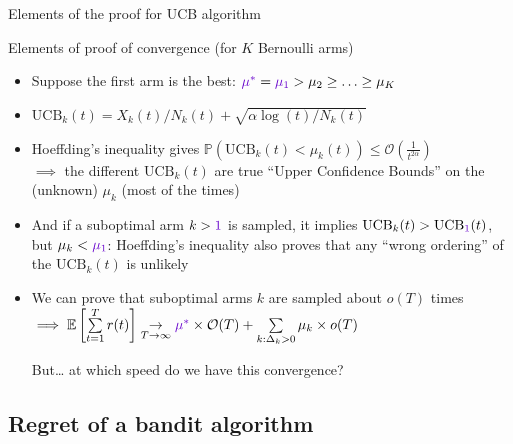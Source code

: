 \documentclass[11pt,english,ignorenonframetext,]{beamer}
\begin{document}
\begin{frame}{Elements of the proof for UCB algorithm}

  \begin{block}{Elements of proof of convergence (for $K$ Bernoulli arms)}
    \begin{itemize}[<+->]
      \item
        Suppose the first arm is the best:
        $\textcolor{deeppurple}{\mu^*} = \textcolor{deeppurple}{\mu_1} > \mu_2 \geq \ldots \geq \mu_K$
      \item
        $\mathrm{UCB}_k(t) = X_k(t) / N_k(t) + \sqrt{\alpha \log(t) / N_k(t)}$
      \item
        Hoeffding's inequality gives
        $\mathbb{P}(\mathrm{UCB}_k(t) < \mu_k(t)) \leq \mathcal{O}(\frac{1}{t^{2 \alpha}})$\\
        $\implies$ the different $\mathrm{UCB}_k(t)$ are true ``Upper Confidence Bounds'' on the (unknown) $\mu_k$ (most of the times)
      \item
        And if a suboptimal arm $k>\textcolor{deeppurple}{1}$ is sampled, it implies
        $\mathrm{UCB}_k(t) > \mathrm{UCB}_{\textcolor{deeppurple}{1}}(t)$, but $\mu_k < \textcolor{deeppurple}{\mu_1}$:
        Hoeffding's inequality also proves that any ``wrong ordering'' of the $\mathrm{UCB}_k(t)$ is unlikely
      \item
        We can prove that suboptimal arms $k$ are sampled about $o(T)$ times\\
        $\implies \mathbb{E}\left[ \sum\limits_{t=1}^T r(t) \right] \underset{T\to\infty}{\to} \textcolor{deeppurple}{\mu^*} \times \mathcal{O}(T) + \sum\limits_{k: \Delta_k>0} \mu_k \times o(T)$
        \dLaughey{}

        \alert{But\ldots{} at which speed do we have this convergence?}
    \end{itemize}
  \end{block}

\end{frame}


\subsection{\hfill{}Regret of a bandit algorithm\hfill{}}
\end{document}
